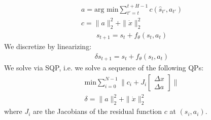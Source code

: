 \documentclass{article}
\begin{document}
\begin{align}
    a = \text{arg min} \sum_{t'=t}^{t+H-1}c(\hat s_{t'},a_{t'})\\
    c = \|a\|^2_2+\|\dot x\|^2_2
\end{align}
\begin{align}
    s_{t+1} = s_t + f_\theta(s_t, a_t)
\end{align}
We discretize by linearizing:
\begin{align}
    \delta s_{t+1} = s_t + f_\theta(s_t, a_t)
\end{align}
We solve via SQP, i.e. we solve a sequence of the following QPs:
\begin{align}
    \text{min} \sum_{i=0}^{N-1}
    \|c_i + J_i \begin{bmatrix}\Delta x\\ \Delta a\end{bmatrix}\|\\
    \delta  = \|a\|^2_2+\|\dot x\|^2_2
\end{align}
where $J_i$ are the Jacobians of the residual function $c$ at $(s_i, a_i)$.
\end{document}
